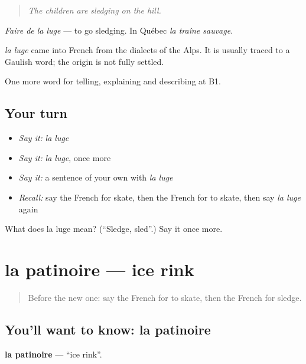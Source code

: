 \begin{quote}
\emph{The children are sledging on the hill.}
\end{quote}

\emph{Faire de la luge} — to go sledging. In Québec \emph{la traîne sauvage}.

\begin{cousinweb}
\emph{la luge} came into French from the dialects of the Alps. It is usually traced to a Gaulish word; the origin is not fully settled.
\end{cousinweb}

\begin{grammarlens}[title={What you've built}]
One more word for telling, explaining and describing at B1.
\end{grammarlens}

\subsection*{Your turn}
\begin{itemize}
\raggedright
  \item \emph{Say it:} \emph{la luge}
  \item \emph{Say it:} \emph{la luge}, once more
  \item \emph{Say it:} a sentence of your own with \emph{la luge}
  \item \emph{Recall:} say the French for skate, then the French for to skate, then say \emph{la luge} again
\end{itemize}

\begin{tcolorbox}[breakable,colback=teal!4,colframe=teal!35!black,title={Before you move on}]
What does la luge mean? (\textquotedblleft{}Sledge, sled\textquotedblright{}.) Say it once more.
\end{tcolorbox}
\section[la patinoire]{la patinoire — ice rink}

\label{lesson:FR-C510-patinoire}



\begin{quote}
Before the new one: say the French for to skate, then the French for sledge.
\end{quote}

\subsection*{You'll want to know: la patinoire}
\textbf{la patinoire} — \textquotedblleft{}ice rink\textquotedblright{}.

